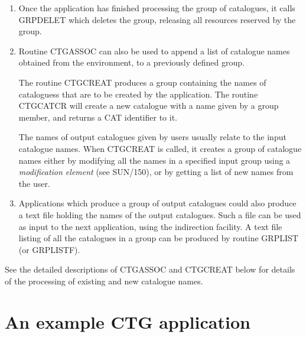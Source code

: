 \documentclass[twoside,11pt]{article}
\newcommand{\htmlref}[2]{#1}
\newcommand{\xref}[3]{#1}
\renewcommand{\_}{\texttt{\symbol{95}}}
\begin{document}
\begin{enumerate}
\item Once the application has finished processing the group of
catalogues, it calls \xref{GRP\_DELET}{sun150}{GRP\_DELET} which deletes 
the group, releasing all resources reserved by the group.

\item Routine CTG\_ASSOC can also be used to append a list of catalogue names 
obtained from the environment, to a previously defined group.

The routine \htmlref{CTG\_CREAT}{CTG_CREAT} produces a group
containing the names of cataloguess that are to be created by the
application. The routine \htmlref{CTG\_CATCR}{CTG_CATCR} will create
a new catalogue with a name given by a group member, and returns a CAT
identifier to it.

The names of output catalogues given by users usually relate to the
input catalogue names.  When CTG\_CREAT is called, it creates a group
of catalogue names either by modifying all the names in a specified
input group using a \emph{modification element} (see
\xref{SUN/150}{sun150}{}), or by getting a list of new names from the
user. 

\item Applications which produce a group of output catalogues could
also produce a text file holding the names of the output catalogues. Such a
file can be used as input to the next application, using the
indirection facility. A text file listing of all the catalogues in a group
can be produced by routine \xref{GRP\_LIST}{sun150}{GRP_LIST} (or 
\xref{GRP\_LISTF}{sun150}{GRP_LISTF}).

\end{enumerate}

See the detailed descriptions of \htmlref{CTG\_ASSOC}{CTG_ASSOC} and
\htmlref{CTG\_CREAT}{CTG_CREAT} below for details of the processing
of existing and new catalogue names.

\section{An example CTG application}
\end{document}
